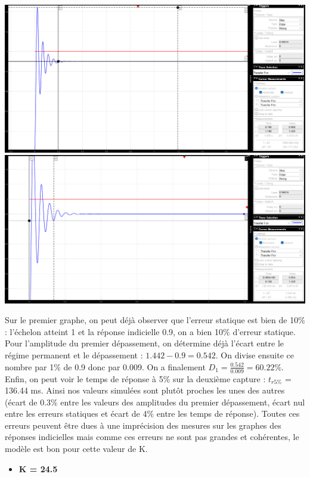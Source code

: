 \documentclass[12pt]{article}
\begin{document}
\begin{center}
    \includegraphics[width = 19 cm]{TP2 Simulink/Syst_2/Depass_4_1_K=4.5.png}
    \includegraphics[width = 19 cm]{TP2 Simulink/Syst_2/tr5prct_4_1_K=4.5.png}
\end{center}
    Sur le premier graphe, on peut déjà observer que l'erreur statique est bien de 10$\%$ : l'échelon atteint 1 et la réponse indicielle 0.9, on a bien 10$\%$ d'erreur statique.
    Pour l'amplitude du premier dépassement, on détermine déjà l'écart entre le régime permanent et le dépassement : $1.442 -0.9 = 0.542$. On divise ensuite ce nombre par 1$\%$ de 0.9 donc par 0.009.
    On a finalement $D_1 = \frac{0.542}{0.009} = 60.22\%$. Enfin, on peut voir le temps de réponse à 5$\%$ sur la deuxième capture : $t_{r5\%}$ = 136.44 ms.
    Ainsi nos valeurs simulées sont plutôt proches les unes des autres (écart de 0.3$\%$ entre les valeurs des amplitudes du premier dépassement, écart nul entre les erreurs statiques et écart de 4$\%$ entre les temps de réponse). Toutes ces erreurs peuvent être dues à une imprécision des mesures sur les graphes des réponses indicielles mais comme ces erreurs ne sont pas grandes et cohérentes, le modèle est bon pour cette valeur de K.
\newpage
\begin{itemize}
    \item \bf \large K = 24.5
\end{itemize}
\end{document}
